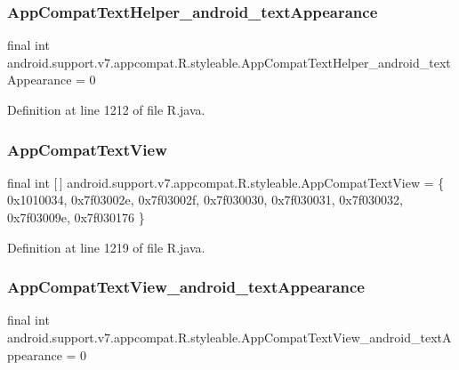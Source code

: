 \subsubsection{\texorpdfstring{AppCompatTextHelper\_android\_textAppearance}{AppCompatTextHelper\_android\_textAppearance}}
{\footnotesize\ttfamily final int android.\+support.\+v7.\+appcompat.\+R.\+styleable.\+App\+Compat\+Text\+Helper\+\_\+android\+\_\+text\+Appearance = 0\hspace{0.3cm}{\ttfamily [static]}}



Definition at line 1212 of file R.\+java.

\mbox{\label{classandroid_1_1support_1_1v7_1_1appcompat_1_1_r_1_1styleable_a87384e67b6e421e7c07536d9afe8d185}} 
\subsubsection{\texorpdfstring{AppCompatTextView}{AppCompatTextView}}
{\footnotesize\ttfamily final int \mbox{[}$\,$\mbox{]} android.\+support.\+v7.\+appcompat.\+R.\+styleable.\+App\+Compat\+Text\+View = \{ 0x1010034, 0x7f03002e, 0x7f03002f, 0x7f030030, 0x7f030031, 0x7f030032, 0x7f03009e, 0x7f030176 \}\hspace{0.3cm}{\ttfamily [static]}}



Definition at line 1219 of file R.\+java.

\mbox{\label{classandroid_1_1support_1_1v7_1_1appcompat_1_1_r_1_1styleable_a3ce93dcbd8fd4d957a09de9dde780dca}} 
\subsubsection{\texorpdfstring{AppCompatTextView\_android\_textAppearance}{AppCompatTextView\_android\_textAppearance}}
{\footnotesize\ttfamily final int android.\+support.\+v7.\+appcompat.\+R.\+styleable.\+App\+Compat\+Text\+View\+\_\+android\+\_\+text\+Appearance = 0\hspace{0.3cm}{\ttfamily [static]}}



